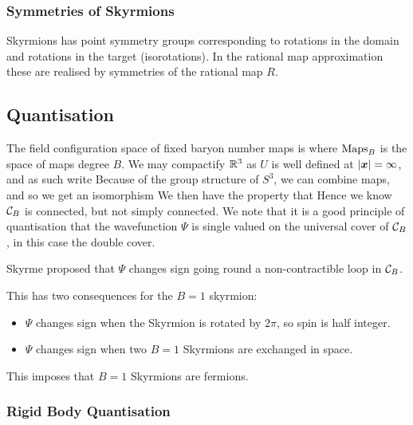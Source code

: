 \documentclass{article}
\begin{document}
\subsubsection{Symmetries of Skyrmions}

Skyrmions has point symmetry groups 
corresponding to rotations in the domain and rotations in the target (isorotations). In the rational map approximation these are realised by symmetries of the rational map $R$. 

\subsection{Quantisation}

The field configuration space of fixed baryon number maps is 
where $\operatorname{Maps}_B$ is the space of maps degree $B$. We may compactify $\mathbb{R}^3$ as $U$ is well defined at $\left\lvert \bm{x} \right\rvert = \infty$, and as such write 
Because of the group structure of $S^3$, we can combine maps, and so we get an isomorphism 
We then have the property that 
Hence we know $\mathcal{C}_B$ is connected, but not simply connected. We note that it is a good principle of quantisation that the wavefunction $\Psi$ is single valued on the universal cover of $\mathcal{C}_B$, in this case the double cover. 

\begin{idea}
Skyrme proposed that $\Psi$ changes sign going round a non-contractible loop in $\mathcal{C}_B$. 
\end{idea}

This has two consequences for the $B=1$ skyrmion:
\begin{itemize}
    \item $\Psi$ changes sign when the Skyrmion is rotated by $2\pi$, so spin is half integer. 
    \item $\Psi$ changes sign when two $B=1$ Skyrmions are exchanged in space. 
\end{itemize}
This imposes that $B=1$ Skyrmions are fermions. 

\subsubsection{Rigid Body Quantisation}
\end{document}

